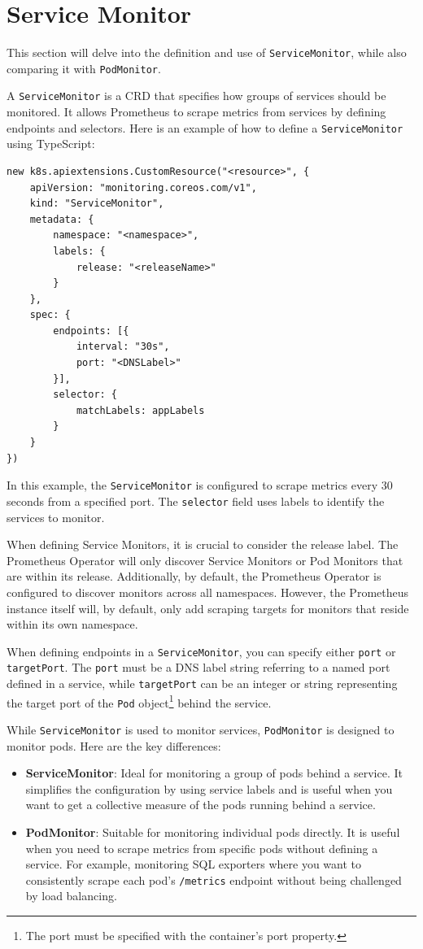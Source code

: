 \section{Service Monitor}
This section will delve into the definition and use of \texttt{ServiceMonitor}, while also comparing it with \texttt{PodMonitor}.

A \texttt{ServiceMonitor} is a CRD that specifies how groups of services should be monitored. It allows Prometheus to scrape metrics from services by defining endpoints and selectors. Here is an example of how to define a \texttt{ServiceMonitor} using TypeScript:

\begin{verbatim}
new k8s.apiextensions.CustomResource("<resource>", {
    apiVersion: "monitoring.coreos.com/v1",
    kind: "ServiceMonitor",
    metadata: {
        namespace: "<namespace>",
        labels: {
            release: "<releaseName>"
        }
    },
    spec: {
        endpoints: [{
            interval: "30s",
            port: "<DNSLabel>"
        }],
        selector: {
            matchLabels: appLabels
        }
    }
})
\end{verbatim}

In this example, the \texttt{ServiceMonitor} is configured to scrape metrics every 30 seconds from a specified port. The \texttt{selector} field uses labels to identify the services to monitor.

When defining Service Monitors, it is crucial to consider the release label. The Prometheus Operator will only discover Service Monitors or Pod Monitors that are within its release. Additionally, by default, the Prometheus Operator is configured to discover monitors across all namespaces. However, the Prometheus instance itself will, by default, only add scraping targets for monitors that reside within its own namespace.

When defining endpoints in a \texttt{ServiceMonitor}, you can specify either \texttt{port} or \texttt{targetPort}. The \texttt{port} must be a DNS label string referring to a named port defined in a service, while \texttt{targetPort} can be an integer or string representing the target port of the \texttt{Pod} object\footnote{The port must be specified with the container's port property.} behind the service.

While \texttt{ServiceMonitor} is used to monitor services, \texttt{PodMonitor} is designed to monitor pods. Here are the key differences:

\begin{itemize}
    \item \textbf{ServiceMonitor}: Ideal for monitoring a group of pods behind a service. It simplifies the configuration by using service labels and is useful when you want to get a collective measure of the pods running behind a service.
    \item \textbf{PodMonitor}: Suitable for monitoring individual pods directly. It is useful when you need to scrape metrics from specific pods without defining a service. For example, monitoring SQL exporters where you want to consistently scrape each pod's \texttt{/metrics} endpoint without being challenged by load balancing.
\end{itemize}

